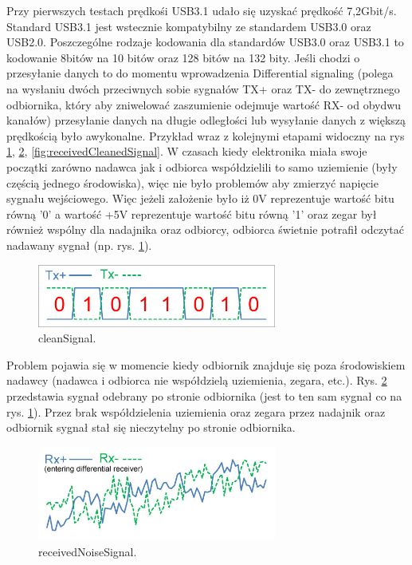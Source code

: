 \documentclass{BscUS}
\begin{document}
\newline
Przy pierwszych testach prędkośi USB3.1 udało się uzyskać prędkość 7,2Gbit/s.
\newline
Standard USB3.1 jest wstecznie kompatybilny ze standardem USB3.0 oraz USB2.0.
\cite{USB30Doc}
\newline
\indent Poszczególne rodzaje kodowania dla standardów USB3.0 oraz USB3.1 to kodowanie 8bitów na 10 bitów oraz 128 bitów na 132 bity. 
Jeśli chodzi o przesyłanie danych to do momentu wprowadzenia Differential signaling (polega na wysłaniu dwóch przeciwnych sobie sygnałów TX+ oraz TX- do zewnętrznego odbiornika, który aby zniwelować zaszumienie odejmuje wartość RX- od obydwu kanałów) przesyłanie danych na długie odległości lub wysyłanie danych z większą prędkością było awykonalne. Przykład wraz z kolejnymi etapami widoczny na rys \ref{fig:cleanSignal}, \ref{fig:receivedNoiseSignal}, \ref{fig:receivedCleanedSignal}.
\newline
\indent W czasach kiedy elektronika miała swoje początki zarówno nadawca jak i odbiorca współdzielili to samo uziemienie (były częścią jednego środowiska), więc nie było problemów aby zmierzyć napięcie sygnału wejściowego. Więc jeżeli założenie było iż 0V reprezentuje wartość bitu równą '0' a wartość +5V reprezentuje wartość bitu równą '1' oraz zegar był również wspólny dla nadajnika oraz odbiorcy, odbiorca świetnie potrafił odczytać nadawany sygnał (np. rys. \ref{fig:cleanSignal}).
\begin{figure}[H]
\centering
\includegraphics[width=0.7\textwidth]{./img/cleanSignal}
\caption{cleanSignal.}
\label{fig:cleanSignal}
\end{figure}
\noindent Problem pojawia się w momencie kiedy odbiornik znajduje się poza środowiskiem nadawcy (nadawca i odbiorca nie współdzielą uziemienia, zegara, etc.). Rys. \ref{fig:receivedNoiseSignal} przedstawia sygnał odebrany po stronie odbiornika (jest to ten sam sygnał co na rys. \ref{fig:cleanSignal}). Przez brak współdzielenia uziemienia oraz zegara przez nadajnik oraz odbiornik sygnał stał się nieczytelny po stronie odbiornika.
\begin{figure}[H]
\centering
\includegraphics[width=0.7\textwidth]{./img/receivedNoiseSignal}
\caption{receivedNoiseSignal.}
\label{fig:receivedNoiseSignal}
\end{figure}
\end{document}
